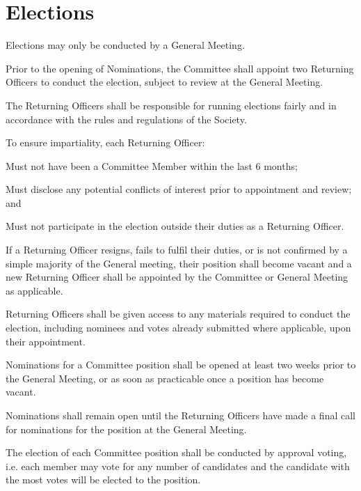 \documentclass[a4paper]{article}
\begin{document}
\section{Elections} \label{sec:elections}
\begin{myEnumerate}
    \item Elections may only be conducted by a General Meeting.
    \item Prior to the opening of Nominations, the Committee shall appoint two Returning Officers to conduct the election, subject to review at the General Meeting.
        \begin{myEnumerate}
            \item The Returning Officers shall be responsible for running elections fairly and in accordance with the rules and regulations of the Society.
            \item To ensure impartiality, each Returning Officer:
                \begin{myEnumerate}
                    \item Must not have been a Committee Member within the last 6 months;
                    \item Must disclose any potential conflicts of interest prior to appointment and review; and
                    \item Must not participate in the election outside their duties as a Returning Officer.
                \end{myEnumerate}
            \item If a Returning Officer resigns, fails to fulfil their duties, or is not confirmed by a simple majority of the General meeting, their position shall become vacant and a new Returning Officer shall be appointed by the Committee or General Meeting as applicable.
            \item Returning Officers shall be given access to any materials required to conduct the election, including nominees and votes already submitted where applicable, upon their appointment.
        \end{myEnumerate}
    \item Nominations for a Committee position shall be opened at least two weeks prior to the General Meeting, or as soon as practicable once a position has become vacant.
    \item Nominations shall remain open until the Returning Officers have made a final call for nominations for the position at the General Meeting.
    \item The election of each Committee position shall be conducted by approval voting, i.e. each member may vote for any number of candidates and the candidate with the most votes will be elected to the position.

\end{myEnumerate}
\end{document}
